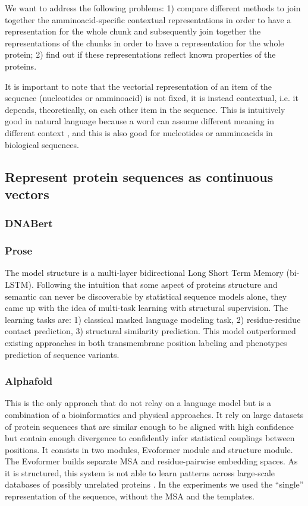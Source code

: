 \documentclass[12pt, letterpaper, twocolumn]{article}
\begin{document}
We want to address the following problems: 1) compare different methods to join together the amminoacid-specific contextual representations in order to have a representation for the whole chunk and subsequently join together the representations of the chunks in order to have a representation for the whole protein; 2) find out if these representations reflect known properties of the proteins.

It is important to note that the vectorial representation of an item of the sequence (nucleotides or amminoacid) is not fixed, it is instead contextual, i.e. it depends, theoretically, on each other item in the sequence. This is intuitively good in natural language because a word can assume different meaning in different context \cite{salant2017contextualized}, and this is also good for nucleotides or amminoacids in biological sequences.

\subsection{Represent protein sequences as continuous vectors}

\subsubsection{DNABert}

\subsubsection{Prose \cite{bepler2021learning}}
The model structure is a multi-layer bidirectional Long Short Term Memory (bi-LSTM). Following the intuition that some aspect of proteins structure and semantic can never be discoverable by statistical sequence models alone, they came up with the idea of multi-task learning with structural supervision. The learning tasks are: 1) classical masked language modeling task, 2) residue-residue contact prediction, 3) structural similarity prediction. This model outperformed existing approaches in both transmembrane position labeling and phenotypes prediction of sequence variants.

\subsubsection{Alphafold \cite{jumper2021highly}}
This is the only approach that do not relay on a language model but is a combination of a bioinformatics and physical approaches.
It rely on large datasets of protein sequences that are similar enough to be aligned with high confidence but contain enough divergence to confidently infer statistical couplings between positions. It consists in two modules, Evoformer module and structure module. The Evoformer builds separate MSA and residue-pairwise embedding spaces. As it is structured, this system is not able to learn patterns across large-scale databases of possibly unrelated proteins \cite{bepler2021learning}.
In the experiments we used the ``single'' representation of the sequence, without the MSA and the templates.
\end{document}
